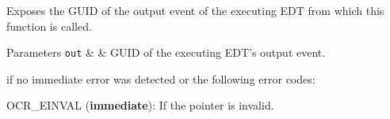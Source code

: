 Exposes the GUID of the output event of the executing EDT from which this function is called.

\begin{DoxyParams}[1]{Parameters}
\mbox{\tt out}  &  & GUID of the executing EDT's output event.\\
\hline
\end{DoxyParams}

 if no immediate error was detected or the following error codes:
\begin{DoxyItemize}
\item OCR\_EINVAL ({\bf immediate}): If the pointer is invalid.
\end{DoxyItemize}
